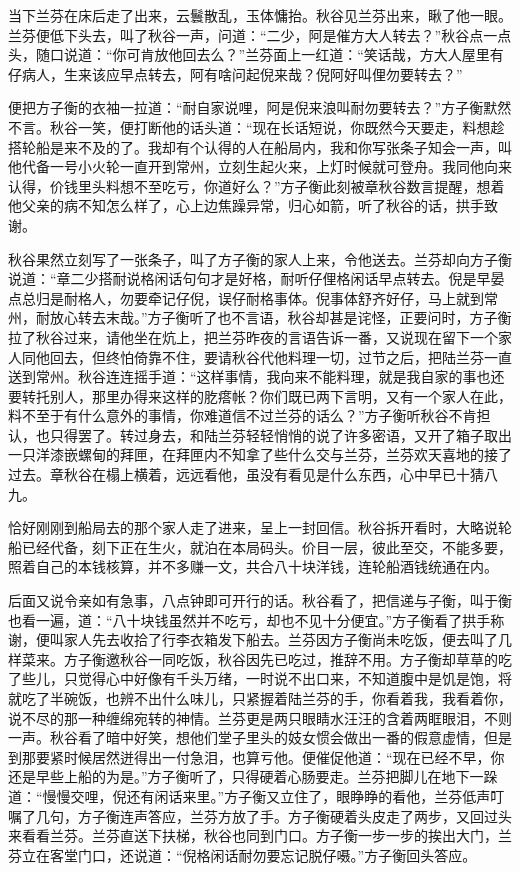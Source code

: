 \documentclass[12pt,UTF8]{ctexbook}
\begin{document}
{{{当下兰芬在床后走了出来，云鬟散乱，玉体慵抬。秋谷见兰芬出来，瞅了他一眼。兰芬便低下头去，叫了秋谷一声，问道：“二少，阿是催方大人转去？”秋谷点一点头，随口说道：“你可肯放他回去么？”兰芬面上一红道：“笑话哉，方大人屋里有仔病人，生来该应早点转去，阿有啥问起倪来哉？倪阿好叫俚勿要转去？”

便把方子衡的衣袖一拉道：“耐自家说哩，阿是倪来浪叫耐勿要转去？”方子衡默然不言。秋谷一笑，便打断他的话头道：“现在长话短说，你既然今天要走，料想趁搭轮船是来不及的了。我却有个认得的人在船局内，我和你写张条子知会一声，叫他代备一号小火轮一直开到常州，立刻生起火来，上灯时候就可登舟。我同他向来认得，价钱里头料想不至吃亏，你道好么？”方子衡此刻被章秋谷数言提醒，想着他父亲的病不知怎么样了，心上边焦躁异常，归心如箭，听了秋谷的话，拱手致谢。

秋谷果然立刻写了一张条子，叫了方子衡的家人上来，令他送去。兰芬却向方子衡说道：“章二少搭耐说格闲话句句才是好格，耐听仔俚格闲话早点转去。倪是早晏点总归是耐格人，勿要牵记仔倪，误仔耐格事体。倪事体舒齐好仔，马上就到常州，耐放心转去末哉。”方子衡听了也不言语，秋谷却甚是诧怪，正要问时，方子衡拉了秋谷过来，请他坐在炕上，把兰芬昨夜的言语告诉一番，又说现在留下一个家人同他回去，但终怕倚靠不住，要请秋谷代他料理一切，过节之后，把陆兰芬一直送到常州。秋谷连连摇手道：“这样事情，我向来不能料理，就是我自家的事也还要转托别人，那里办得来这样的肐瘩帐？你们既已两下言明，又有一个家人在此，料不至于有什么意外的事情，你难道信不过兰芬的话么？”方子衡听秋谷不肯担认，也只得罢了。转过身去，和陆兰芬轻轻悄悄的说了许多密语，又开了箱子取出一只洋漆嵌螺甸的拜匣，在拜匣内不知拿了些什么交与兰芬，兰芬欢天喜地的接了过去。章秋谷在榻上横着，远远看他，虽没有看见是什么东西，心中早已十猜八九。

恰好刚刚到船局去的那个家人走了进来，呈上一封回信。秋谷拆开看时，大略说轮船已经代备，刻下正在生火，就泊在本局码头。价目一层，彼此至交，不能多要，照着自己的本钱核算，并不多赚一文，共合八十块洋钱，连轮船酒钱统通在内。

后面又说令亲如有急事，八点钟即可开行的话。秋谷看了，把信递与子衡，叫于衡也看一遍，道：“八十块钱虽然并不吃亏，却也不见十分便宜。”方子衡看了拱手称谢，便叫家人先去收拾了行李衣箱发下船去。兰芬因方子衡尚未吃饭，便去叫了几样菜来。方子衡邀秋谷一同吃饭，秋谷因先已吃过，推辞不用。方子衡却草草的吃了些儿，只觉得心中好像有千头万绪，一时说不出口来，不知道腹中是饥是饱，将就吃了半碗饭，也辨不出什么味儿，只紧握着陆兰芬的手，你看着我，我看着你，说不尽的那一种缠绵宛转的神情。兰芬更是两只眼睛水汪汪的含着两眶眼泪，不则一声。秋谷看了暗中好笑，想他们堂子里头的妓女惯会做出一番的假意虚情，但是到那要紧时候居然迸得出一付急泪，也算亏他。便催促他道：“现在已经不早，你还是早些上船的为是。”方子衡听了，只得硬着心肠要走。兰芬把脚儿在地下一跺道：“慢慢交哩，倪还有闲话来里。”方子衡又立住了，眼睁睁的看他，兰芬低声叮嘱了几句，方子衡连声答应，兰芬方放了手。方子衡硬着头皮走了两步，又回过头来看看兰芬。兰芬直送下扶梯，秋谷也同到门口。方子衡一步一步的挨出大门，兰芬立在客堂门口，还说道：“倪格闲话耐勿要忘记脱仔嗫。”方子衡回头答应。

}}}
\end{document}
